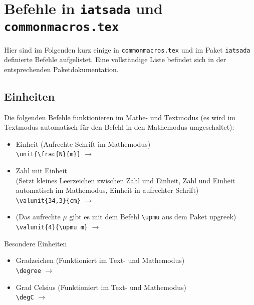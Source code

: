 \chapter{Befehle in \texttt{iatsada} und \texttt{commonmacros.tex}}
\label{cha:commonmacros}
Hier sind im Folgenden kurz einige in \texttt{commonmacros.tex} und im Paket \texttt{iatsada} definierte Befehle aufgelistet.
Eine vollständige Liste befindet sich in der entsprechenden Paketdokumentation.
%
\section*{Einheiten}
Die folgenden Befehle funktionieren im Mathe- und Textmodus (\dah es wird im Textmodus automatisch für den Befehl in den Mathemodus umgeschaltet):
\begin{itemize}
	\item Einheit (Aufrechte Schrift im Mathemodus)\\ \verb|\unit{}| $\rightarrow$ \unit{\frac{N}{m}}
	\item Zahl mit Einheit\\(Setzt \glqq{}kleines\grqq{} Leerzeichen zwischen Zahl und Einheit, Zahl und Einheit automatisch im Mathemodus, Einheit in aufrechter Schrift)\\ \verb|| $\rightarrow$ \valunit{34,3}{cm}
	\item (Das aufrechte $\mu$ gibt es mit dem Befehl \verb|\upmu| aus dem Paket upgreek)\\ \verb|| $\rightarrow$ \valunit{4}{\upmu m}
\end{itemize}

\noindent Besondere Einheiten
\begin{itemize}
	\item Gradzeichen (Funktioniert im Text- und Mathemodus)\\ \verb|\degree| $\rightarrow$ \degree
	\item Grad Celsius (Funktioniert im Text- und Mathemodus)\\ \verb|\degC| $\rightarrow$ \degC
\end{itemize}


